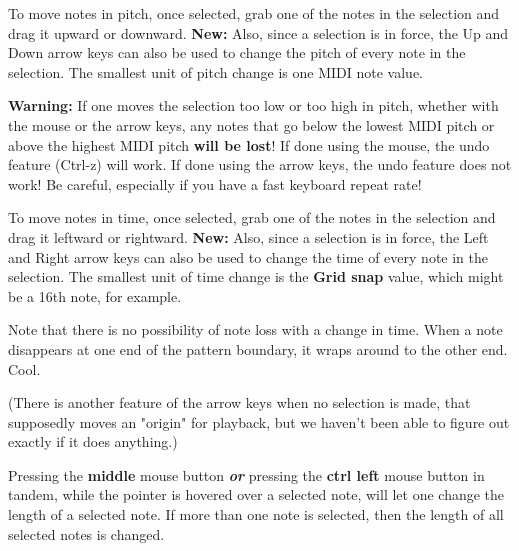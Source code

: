    To move notes in pitch, once selected, grab one of the notes in the
   selection and drag it upward or downward.
   \textbf{New:}
   Also, since a selection is in force, the Up and Down arrow keys can also
   be used to change the pitch of every note in the selection.
   The smallest unit of pitch change is one MIDI note value.

   \textbf{Warning:}
   If one moves the selection too low or too high in pitch, whether with the
   mouse or the arrow keys, any notes that go below the lowest MIDI pitch or
   above the highest MIDI pitch \textbf{will be lost}!
   If done using the mouse, the undo feature (Ctrl-z) will work.
   If done using the arrow keys, the undo feature does not work!
   Be careful, especially if you have a fast keyboard repeat rate!

   To move notes in time, once selected, grab one of the notes in the
   selection and drag it leftward or rightward.
   \textbf{New:}
   Also, since a selection is in force, the Left and Right arrow keys can also
   be used to change the time of every note in the selection.
   The smallest unit of time change is the \textbf{Grid snap} value,
   which might be a 16th note, for example.

   Note that there is no possibility of note loss with a change in time.  When
   a note disappears at one end of the pattern boundary, it wraps around to the
   other end.  Cool.

   (There is another feature of the arrow keys when no selection is made, that
   supposedly moves an "origin" for playback, but we haven't been able to
   figure out exactly if it does anything.)

   Pressing the \textbf{middle} mouse button \textbf{\textsl{or}}
   pressing the \textbf{ctrl left} mouse button in tandem, while the pointer is
   hovered over a selected note, will let one change the length of a selected
   note.  If more than one note is selected, then the length of all selected
   notes is changed.


